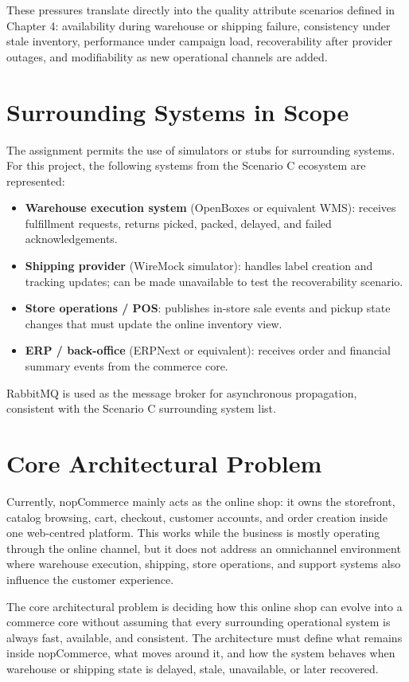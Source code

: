 These pressures translate directly into the quality attribute scenarios defined in Chapter 4:
availability during warehouse or shipping failure, consistency under stale inventory,
performance under campaign load, recoverability after provider outages, and modifiability as
new operational channels are added.

\section{Surrounding Systems in Scope}

The assignment permits the use of simulators or stubs for surrounding systems. For this
project, the following systems from the Scenario C ecosystem are represented:

\begin{itemize}
    \item \textbf{Warehouse execution system} (OpenBoxes or equivalent WMS): receives
    fulfillment requests, returns picked, packed, delayed, and failed acknowledgements.
    \item \textbf{Shipping provider} (WireMock simulator): handles label creation and
    tracking updates; can be made unavailable to test the recoverability scenario.
    \item \textbf{Store operations / POS}: publishes in-store sale events and pickup state
    changes that must update the online inventory view.
    \item \textbf{ERP / back-office} (ERPNext or equivalent): receives order and financial
    summary events from the commerce core.
\end{itemize}

RabbitMQ is used as the message broker for asynchronous propagation, consistent with the
Scenario C surrounding system list.

\section{Core Architectural Problem}

Currently, nopCommerce mainly acts as the online shop: it owns the storefront, catalog
browsing, cart, checkout, customer accounts, and order creation inside one web-centred
platform. This works while the business is mostly operating through the online channel, but it
does not address an omnichannel environment where warehouse execution, shipping, store
operations, and support systems also influence the customer experience.

The core architectural problem is deciding how this online shop can evolve into a commerce
core without assuming that every surrounding operational system is always fast, available, and
consistent. The architecture must define what remains inside nopCommerce, what moves around
it, and how the system behaves when warehouse or shipping state is delayed, stale, unavailable,
or later recovered.
